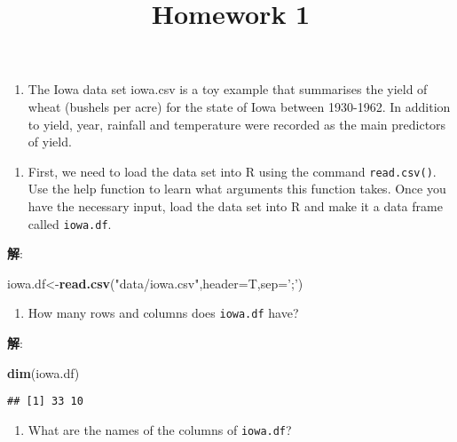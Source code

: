 \documentclass[
]{article}
\title{Homework 1}
\author{}
\date{\vspace{-2.5em}}
\newenvironment{Shaded}{\begin{snugshade}}{\end{snugshade}}
\newcommand{\DataTypeTok}[1]{\textcolor[rgb]{0.13,0.29,0.53}{#1}}
\newcommand{\KeywordTok}[1]{\textcolor[rgb]{0.13,0.29,0.53}{\textbf{#1}}}
\newcommand{\NormalTok}[1]{#1}
\newcommand{\StringTok}[1]{\textcolor[rgb]{0.31,0.60,0.02}{#1}}
\providecommand{\tightlist}{%
  \setlength{\itemsep}{0pt}\setlength{\parskip}{0pt}}
\begin{document}
\maketitle

\begin{enumerate}
\def\labelenumi{\arabic{enumi}.}
\tightlist
\item
  The Iowa data set iowa.csv is a toy example that summarises the yield
  of wheat (bushels per acre) for the state of Iowa between 1930-1962.
  In addition to yield, year, rainfall and temperature were recorded as
  the main predictors of yield.
\end{enumerate}

\begin{enumerate}
\def\labelenumi{\alph{enumi}.}
\tightlist
\item
  First, we need to load the data set into R using the command
  \texttt{read.csv()}. Use the help function to learn what arguments
  this function takes. Once you have the necessary input, load the data
  set into R and make it a data frame called \texttt{iowa.df}.
\end{enumerate}

\textbf{解}:

\begin{Shaded}
\begin{Highlighting}[]
\NormalTok{iowa.df<-}\KeywordTok{read.csv}\NormalTok{(}\StringTok{"data/iowa.csv"}\NormalTok{,}\DataTypeTok{header=}\NormalTok{T,}\DataTypeTok{sep=}\StringTok{';'}\NormalTok{)}
\end{Highlighting}
\end{Shaded}

\begin{enumerate}
\def\labelenumi{\alph{enumi}.}
\setcounter{enumi}{1}
\tightlist
\item
  How many rows and columns does \texttt{iowa.df} have?
\end{enumerate}

\textbf{解}:

\begin{Shaded}
\begin{Highlighting}[]
\KeywordTok{dim}\NormalTok{(iowa.df)}
\end{Highlighting}
\end{Shaded}

\begin{verbatim}
## [1] 33 10
\end{verbatim}

\begin{enumerate}
\def\labelenumi{\alph{enumi}.}
\setcounter{enumi}{2}
\tightlist
\item
  What are the names of the columns of \texttt{iowa.df}?
\end{enumerate}
\end{document}
